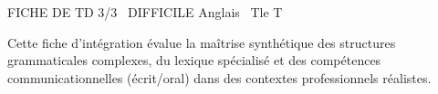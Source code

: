 \documentclass[11pt]{article}
\begin{document}
\begin{tcolorbox}[enhanced,colback=popink,colframe=popink,arc=10pt,boxrule=0pt,left=12pt,right=12pt,top=9pt,bottom=9pt]
{\color{white}\popxbold\small FICHE DE TD 3/3 \textbullet\ DIFFICILE \hfill Anglais \textbullet\ Tle T\par}
\end{tcolorbox}
\vspace{4pt}
Cette fiche d'intégration évalue la maîtrise synthétique des structures grammaticales complexes, du lexique spécialisé et des compétences communicationnelles (écrit/oral) dans des contextes professionnels réalistes.
\end{document}
